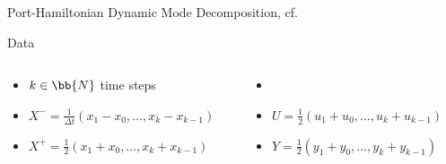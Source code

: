 \begin{frame}{Port-Hamiltonian Dynamic Mode Decomposition, cf.~\cite{Morandin2022}}
    \begin{block}{Data}
        \begin{columns}[totalwidth=\linewidth]
            \begin{column}{.49\textwidth}
                \begin{itemize}
                    \item $k \in \bb{N}$ time steps
                    \item $X^- = \frac{1}{\Delta t} \left( x_1 - x_0, \dots, x_k - x_{k - 1} \right)$
                    \item $X^+ = \frac{1}{2} \left( x_1 + x_0, \dots, x_k + x_{k - 1} \right)$
                \end{itemize}
            \end{column}
            \begin{column}{.49\textwidth}
                \begin{itemize}
                    \item[] \phantom{}
                    \item $U = \frac{1}{2} \left( u_1 + u_0, \dots, u_k + u_{k - 1} \right)$
                    \item $Y = \frac{1}{2} \left( y_1 + y_0, \dots, y_k + y_{k - 1} \right)$
                \end{itemize}
            \end{column}
        \end{columns}
    \end{block}

\end{frame}